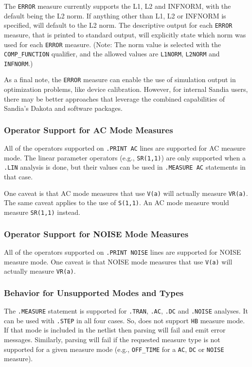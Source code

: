 \begin{XyceItemize}
  \item The {\tt ERROR} measure currently supports the L1, L2 and
    INFNORM, with the default being the L2 norm.  If anything other
    than L1, L2 or INFNORM is specified, \Xyce{} will default to the
    L2 norm.  The descriptive output for each {\tt ERROR} measure,
    that is printed to standard output, will explicitly state which
    norm was used for each {\tt ERROR} measure.  (Note: The norm value
    is selected with the {\tt COMP\_FUNCTION} qualifier, and the
    allowed values are {\tt L1NORM}, {\tt L2NORM} and {\tt INFNORM}.)

\end{XyceItemize}

As a final note, the \texttt{ERROR} measure can enable the use
of \Xyce{} simulation output in optimization problems, like device
calibration.  However, for internal Sandia users, there may be better
approaches that leverage the combined capabilities of Sandia's Dakota
and \Xyce{} software packages.

\subsubsection{Operator Support for AC Mode Measures}
\label{Measure_AC_Op_Support}
All of the operators supported on \texttt{.PRINT AC} lines are supported
for AC measure mode.  The linear parameter operators (e.g., \texttt{SR(1,1)})
are only supported when a \texttt{.LIN} analysis is done, but their values
can be used in \texttt{.MEASURE AC} statements in that case.

One caveat is that AC mode measures that use \texttt{V(a)} will actually
measure \texttt{VR(a)}. The same caveat applies to the use of \texttt{S(1,1)}.
An AC mode measure would measure \texttt{SR(1,1)} instead.

\subsubsection{Operator Support for NOISE Mode Measures}
\label{Measure_AC_Op_Support}
All of the operators supported on \texttt{.PRINT NOISE} lines are supported
for NOISE measure mode.  One caveat is that NOISE mode measures that use
\texttt{V(a)} will actually measure \texttt{VR(a)}.

\subsubsection{Behavior for Unsupported Modes and Types}
\label{Measure_Unsupported_Types}
The \texttt{.MEASURE} statement is supported
for \texttt{.TRAN}, \texttt{.AC}, \texttt{.DC} and \texttt{.NOISE}
analyses. It can be used with {\tt .STEP} in all four cases.
So, \Xyce{} does not support \texttt{HB} measure mode.  If that mode
is included in the netlist then \Xyce{}
parsing will fail and emit error messages.  Similarly, \Xyce{} parsing
will fail if the requested measure type is not supported for a given
measure mode (e.g., \texttt{OFF\_TIME} for a \texttt{AC}, \texttt{DC}
or \texttt{NOISE} measure).

